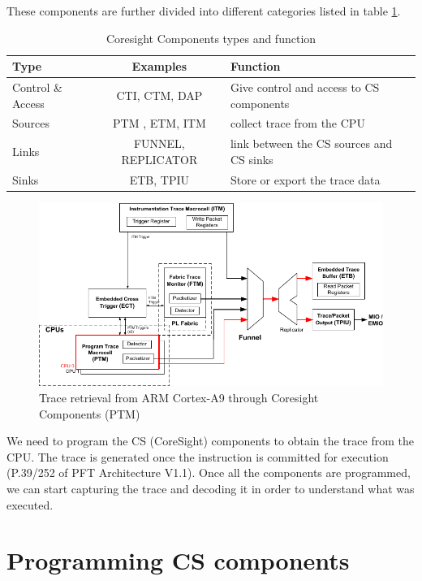\documentclass[10pt,a4paper, oneside]{memoir}
\begin{document}
These components are further divided into different categories listed in table \ref{tab:coresight_components_type}.

\begin{table}[!h]
\centering
\begin{tabular}{l|cl}
\toprule
\textbf{Type} & \textbf{Examples} & 	\textbf{Function}
\\ \midrule
Control \& Access & CTI, CTM, DAP & Give control and access to CS components \\
Sources & PTM , ETM, ITM &	collect trace from the CPU \\
Links &	FUNNEL, REPLICATOR & link between the CS sources and CS sinks\\
Sinks &	ETB, TPIU & Store or export the trace data \\
\bottomrule
\end{tabular}
\caption{Coresight Components types and function}
\label{tab:coresight_components_type}
\end{table}


\begin{figure}
\centering
\includegraphics[width=\textwidth, keepaspectratio]{images/trace_retrieval}
\caption{Trace retrieval from ARM Cortex-A9 through Coresight Components (PTM)}
\label{fig:trace_retrieval}
\end{figure}


We need to program the CS (CoreSight) components to obtain the trace from the CPU. The trace is generated once the instruction is committed for execution (P.39/252 of PFT Architecture V1.1). Once all the components are programmed, we can start capturing the trace and decoding it in order to understand what was executed.  

\section{Programming CS components}
\label{sec:programming_cs_components}
\end{document}
